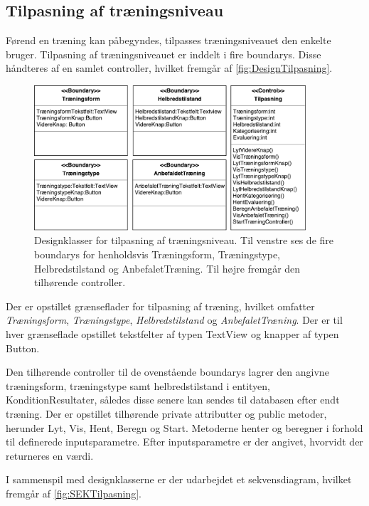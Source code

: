 \subsection*{Tilpasning af træningsniveau}
Førend en træning kan påbegyndes, tilpasses træningsniveauet den enkelte bruger. Tilpasning af træningsniveauet er inddelt i fire boundarys. Disse håndteres af en samlet controller, hvilket fremgår af \autoref{fig:DesignTilpasning}.

\begin{figure} [H]
\centering
\includegraphics[width=0.9\textwidth]{figures/MVC/MVCTilpasning}
\caption{Designklasser for tilpasning af træningsniveau. Til venstre ses de fire boundarys for henholdsvis Træningsform, Træningstype, Helbredstilstand og AnbefaletTræning. Til højre fremgår den tilhørende controller.}
\label{fig:DesignTilpasning}
\end{figure}

\noindent
Der er opstillet grænseflader for tilpasning af træning, hvilket omfatter \textit{Træningsform}, \textit{Træningstype}, \textit{Helbredstilstand} og \textit{AnbefaletTræning}. Der er til hver grænseflade opstillet tekstfelter af typen TextView og knapper af typen Button.   

Den tilhørende controller til de ovenstående boundarys lagrer den angivne træningsform, træningstype samt helbredstilstand  i entityen, KonditionResultater, således disse senere kan sendes til databasen efter endt træning. Der er opstillet tilhørende private attributter og public metoder, herunder Lyt, Vis, Hent, Beregn og Start. Metoderne henter og beregner i forhold til definerede inputsparametre. Efter inputsparametre er der angivet, hvorvidt der returneres en værdi.

I sammenspil med designklasserne er der udarbejdet et sekvensdiagram, hvilket fremgår af \autoref{fig:SEKTilpasning}. 

